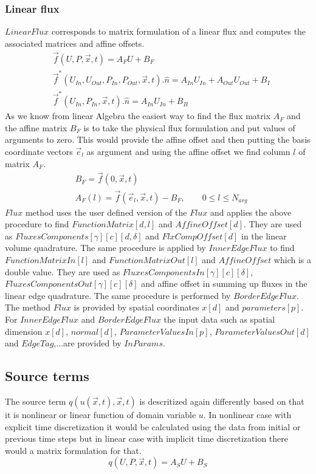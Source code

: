 \documentclass[BoSSSForSolvingConservationLaws.tex]{subfiles}
\begin{document}
\subsubsection{Linear flux}
$LinearFlux$ corresponds to matrix formulation of a linear flux and computes the associated matrices and affine offsets.
\begin{align*}
&\vec{f}(U,P,\vec{x},t)=A_F U+B_F\\
&\vec{f}^*(U_{In},U_{Out},P_{In},P_{Out},\vec{x},t).\hat{n}=A_{In} U_{In}+A_{Out} U_{Out}+B_I\\
&\vec{f}^*(U_{In},P_{In},\vec{x},t).\hat{n}=A_{In} U_{In}+B_B
\end{align*}
As we know from linear Algebra the easiest way to find the flux matrix $A_F$ and the affine matrix $B_F$ is to take the physical flux formulation and put values of arguments to zero. This would provide the affine offset and then putting the basis coordinate vectors $\vec{e}_l$ as argument and using the affine offset we find column $l$ of matrix $A_F$.
\begin{align*}
&B_F=\vec{f}(0,\vec{x},t)\\
&A_F(l)=\vec{f}(\vec{e}_l,\vec{x},t)-B_F, \qquad 0\leq l \leq N_{arg}
\end{align*}
$Flux$ method uses the user defined version of the $Flux$ and applies the above procedure to find $FunctionMatrix[d,l]$ and $AffineOffset[d]$. They are used as $FluxesComponents[\gamma][c][d,\delta]$ and $FlxCompOffset[d]$ in the linear volume quadrature. The same procedure is applied by $InnerEdgeFlux$ to find $FunctionMatrixIn[l]$ and $FunctionMatrixOut[l]$ and $AffineOffset$ which is a double value. They are used as $FluxesComponentsIn[\gamma][c][\delta]$, \\$FluxesComponentsOut[\gamma][c][\delta]$ and affine offset in summing up fluxes in the linear edge quadrature. The same procedure is performed by $BorderEdgeFlux$.\\
The method $Flux$ is provided by spatial coordinates $x[d]$ and $parameters[p]$. For $InnerEdgeFlux$ and $BorderEdgeFlux$ the input data such as spatial dimension $x[d]$, $normal[d]$, $ParameterValuesIn[p]$, $ParameterValuesOut[d]$ and $EdgeTag$,...are provided by $InParams$.

\subsection{Source terms}
The source term $q(u(\vec{x},t),\vec{x},t)$ is descritized again differently based on that it is nonlinear or linear function of domain variable $u$. In nonlinear case with explicit time discretization it would be calculated using the data from initial or previous time steps but in linear case with implicit time discretization there would a matrix formulation for that.
\[
q(U,P,\vec{x},t)=A_S U+B_S
\]
\end{document}
